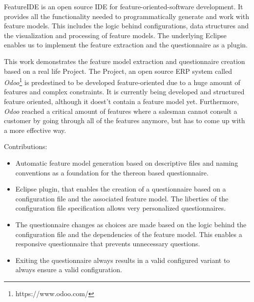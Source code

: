 FeatureIDE is an open source IDE for feature-oriented-software development. It provides all the functionality needed to programmatically generate and work with feature models. This includes the logic behind configurations, data structures and the visualization and processing of feature models. The underlying Eclipse enables us to implement the feature extraction and the questionnaire as a plugin.

This work demonstrates the feature model extraction and questionnaire creation based on a real life Project. The Project, an open source ERP system called \textit{Odoo}\footnote{https://www.odoo.com/} is predestined to be developed feature-oriented due to a huge amount of features and complex constraints. It is currently being developed and structured feature oriented, although it doest't contain a feature model yet. Furthermore, \textit{Odoo} reached a critical amount of features where a salesman cannot consult a customer by going through all of the features anymore, but has to come up with a more effective way.

Contributions:
\begin{itemize}
\item Automatic feature model generation based on descriptive files and naming conventions as a foundation for the thereon based questionnaire.
\item Eclipse plugin, that enables the creation of a questionnaire based on a configuration file and the associated feature model. The liberties of the configuration file specification allows very personalized questionnaires.
\item The questionnaire changes as choices are made based on the logic behind the configuration file and the dependencies of the feature model. This enables a responsive questionnaire that prevents unnecessary questions.
\item Exiting the questionnaire always results in a valid configured variant to always ensure a valid configuration.
\end{itemize}